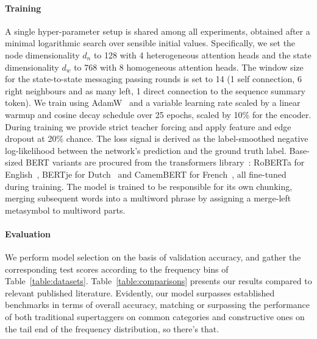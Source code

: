 \paragraph{Training}
A single hyper-parameter setup is shared among all experiments, obtained after a minimal logarithmic search over sensible initial values.
Specifically, we set the node dimensionality $d_n$ to 128 with 4 heterogeneous attention heads and the state dimensionality $d_w$ to 768 with 8 homogeneous attention heads.
The window size for the state-to-state messaging passing rounds is set to 14 (1 self connection, 6 right neighbours and as many left, 1 direct connection to the sequence summary token).
We train using AdamW~\cite{	loshchilov2018decoupled} and a variable learning rate scaled by a linear warmup and cosine decay schedule over 25 epochs, scaled by 10\% for the encoder.
During training we provide strict teacher forcing and apply feature and edge dropout at 20\% chance.
The loss signal is derived as the label-smoothed negative log-likelihood between the network's prediction and the ground truth label.
Base-sized BERT variants are procured from the transformers library~\cite{wolf2020transformers}: RoBERTa for English~\cite{liu2019roberta}, BERTje for Dutch~\cite{de2019bertje} and CamemBERT for French~\cite{martin2020camembert}, all fine-tuned during training.
The model is trained to be responsible for its own chunking, merging subsequent words into a multiword phrase by assigning a merge-left metasymbol to multiword parts. 

\paragraph{Evaluation}
We perform model selection on the basis of validation accuracy, and gather the corresponding test scores according to the frequency bins of Table~\ref{table:datasets}.
Table~\ref{table:comparisons} presents our results compared to relevant published literature.
Evidently, our model surpasses established benchmarks in terms of overall accuracy, matching or surpassing the performance of both traditional supertaggers on common categories and constructive ones on the tail end of the frequency distribution, so there's that.

